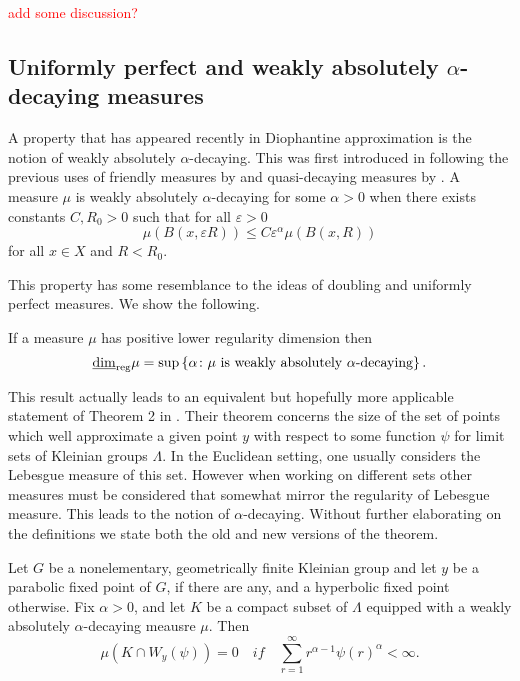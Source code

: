 \textcolor{red}{add some discussion?}


\subsection{Uniformly perfect and weakly absolutely $\alpha$-decaying measures}

A property that has appeared recently in Diophantine approximation is the notion of weakly absolutely $\alpha$-decaying. This was first introduced in \cite{beres-sanju-al} following the previous uses of friendly measures by \cite{friendly} and quasi-decaying measures by \cite{decaying1, decaying2}. A measure $\mu$ is weakly absolutely $\alpha$-decaying for some $\alpha > 0$ when there exists constants $C, R_0 >0$ such that for all $\varepsilon > 0$
\[
\mu(B(x,\varepsilon R)) \le C \varepsilon^{\alpha} \mu(B(x,R))
\]
for all $x \in X$ and $R<R_0$.

This property has some resemblance to the ideas of doubling and uniformly perfect measures. We show the following.
\begin{proposition}
	If a measure $\mu$ has positive lower regularity dimension then 
	\[
	\underline{\dim}_{\textup{reg}} \mu = \sup\left\{\alpha \colon \mu \text{ is weakly absolutely $\alpha$-decaying}\right\}.
	\]
\end{proposition}

This result actually leads to an equivalent but hopefully more applicable statement of Theorem 2 in \cite{beres-sanju-al}. Their theorem concerns the size of the set of points which well approximate a given point $y$ with respect to some function $\psi$ for limit sets of Kleinian groups $\Lambda$. In the Euclidean setting, one usually considers the Lebesgue measure of this set. However when working on different sets other measures must be considered that somewhat mirror the regularity of Lebesgue measure. This leads to the notion of $\alpha$-decaying. Without further elaborating on the definitions we state both the old and new versions of the theorem.

\begin{theorem}
	Let $G$ be a nonelementary, geometrically finite Kleinian group and let $y$ be a parabolic fixed point of $G$, if there are any, and a hyperbolic fixed point otherwise. Fix $\alpha > 0$, and let $K$ be a compact subset of $\Lambda$ equipped with a weakly absolutely $\alpha$-decaying meausre $\mu$. Then
	\[
	\mu(K\cap W_y(\psi)) = 0 \quad if \quad \sum_{r=1}^\infty r^{\alpha-1} \psi(r)^{\alpha} < \infty.
	\]
\end{theorem}

